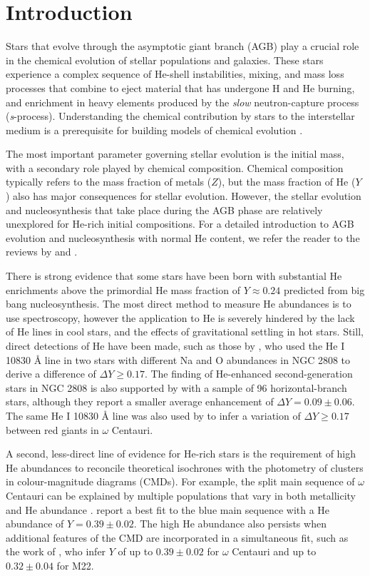 \section{Introduction}\label{sec:intro}
Stars that evolve through the asymptotic giant branch (AGB) play a crucial role in the chemical evolution of stellar populations and galaxies. These stars experience a complex sequence of He-shell instabilities, mixing, and mass loss processes that combine to eject material that has undergone H and He burning, and enrichment in heavy elements produced by the \textit{slow} neutron-capture process (\textit{s}-process). Understanding the chemical contribution by stars to the interstellar medium is a prerequisite for building models of chemical evolution \citep[e.g.,][]{Chiappini:2001ds,Kobayashi:2011hj}.

The most important parameter governing stellar evolution is the initial mass, with a secondary role played by chemical composition. Chemical composition typically refers to the mass fraction of metals ($Z$), but the mass fraction of He ($Y$) also has major consequences for stellar evolution. However, the stellar evolution and nucleosynthesis that take place during the AGB phase are relatively unexplored for He-rich initial compositions. For a detailed introduction to AGB evolution and nucleosynthesis with normal He content, we refer the reader to the reviews by \citet{Herwig:2005jn} and \citet{Karakas:2014jt}.

There is strong evidence that some stars have been born with substantial He enrichments above the primordial He mass fraction of $Y\approx 0.24$ predicted from big bang nucleosynthesis. The most direct method to measure He abundances is to use spectroscopy, however the application to He is severely hindered by the lack of He lines in cool stars, and the effects of gravitational settling in hot stars. Still, direct detections of He have been made, such as those by \citet{Pasquini:2011kf}, who used the He I 10830 {\AA} line in two stars with different Na and O abundances in NGC 2808 to derive a difference of $\Delta Y \geq 0.17$. The finding of He-enhanced second-generation stars in NGC 2808 is also supported by \citet{Marino:2014fj} with a sample of 96 horizontal-branch stars, although they report a smaller average enhancement of $\Delta Y = 0.09 \pm 0.06$. The same He I 10830 {\AA} line was also used by \citet{Dupree:2013cb} to infer a variation of $\Delta Y \geq 0.17$ between red giants in $\omega$ Centauri.

A second, less-direct line of evidence for He-rich stars is the requirement of high He abundances to reconcile theoretical isochrones with the photometry of clusters in colour-magnitude diagrams (CMDs). For example, the split main sequence of $\omega$ Centauri can be explained by multiple populations that vary in both metallicity and He abundance \citep{Bedin:2004hn,Norris:2004jg,Piotto:2005ii}. \citet{King:2012bf} report a best fit to the blue main sequence with a He abundance of $Y=0.39 \pm 0.02$. The high He abundance also persists when additional features of the CMD are incorporated in a simultaneous fit, such as the work of \citet{Joo:2013dr}, who infer $Y$ of up to $0.39\pm 0.02$ for $\omega$ Centauri and up to $0.32\pm 0.04$ for M22.

